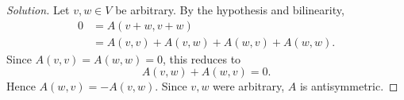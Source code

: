 \begin{proof}[Solution]
Let \(v,w\in V\) be arbitrary. By the hypothesis and bilinearity,
\begin{align*}
  0&=A(v+w,v+w)\\
   &=A(v,v)+A(v,w)+A(w,v)+A(w,w).
\end{align*}
Since \(A(v,v)=A(w,w)=0\), this reduces to
\[
  A(v,w)+A(w,v)=0.
\]
Hence \(A(w,v)=-A(v,w)\). Since \(v,w\) were arbitrary, \(A\) is
antisymmetric.
\end{proof}
